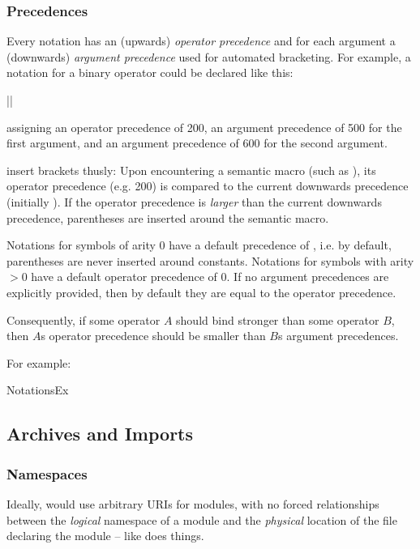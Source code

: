  \subsubsection{Precedences}

 Every notation has an (upwards) \emph{operator precedence} and
 for each argument a (downwards) \emph{argument precedence}
 used for automated bracketing. For example, a notation
 for a binary operator  could be declared like this:
 \begin{center} || \end{center}
 assigning an operator precedence of 200, an argument precedence
 of 500 for the first argument, and an argument precedence of 600
 for the second argument.

 \sTeX insert brackets thusly: Upon encountering a semantic
 macro (such as ), its operator precedence (e.g. 200)
 is compared to the current downwards precedence (initially 
 ). If the operator precedence is \emph{larger}
 than the current downwards precedence, parentheses are inserted
 around the semantic macro.

 Notations for symbols of arity 0 have a default precedence of ,
 i.e. by default, parentheses are never inserted around constants.
 Notations for symbols with arity $>0$ have a default operator
 precedence of $0$.
 If no argument precedences are explicitly provided, then by
 default they are equal to the operator precedence.

 Consequently, if some operator $A$ should bind stronger than
 some operator $B$, then $A$s operator precedence should be
 smaller than $B$s argument precedences.

 For example:
 \begin{@module}{NotationsEx}


 \end{@module}

 \subsection{Archives and Imports}

 \subsubsection{Namespaces}
   Ideally, \sTeX would use arbitrary URIs for modules, with no
   forced relationships between the \emph{logical} namespace
   of a module and the \emph{physical} location of the file
   declaring the module -- like \mmt does things.

